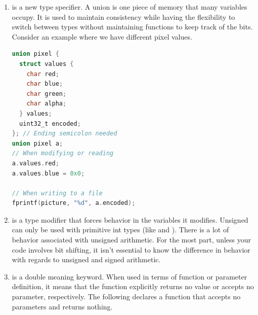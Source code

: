 \begin{enumerate}
	      \begin{lstlisting}[language=C]
typedef float real;
real gravity = 10;
// Also typedef gives us an abstraction over the underlying type used.
// In the future, we only need to change this typedef if we
// wanted our physics library to use doubles instead of floats.

typedef struct link link_t;
//With structs, include the keyword 'struct' as part of the original types
\end{lstlisting}

	      In this class, we regularly typedef functions.
        A typedef for a function can be this for example

	      \begin{lstlisting}[language=C]
typedef int (*comparator)(void*,void*);

int greater_than(void* a, void* b){
    return a > b;
}
comparator gt = greater_than;
\end{lstlisting}

	      This declares a function type comparator that accepts two  params and returns an integer.

	    \item {} is a new type specifier.
        A union is one piece of memory that many variables occupy.
        It is used to maintain consistency while having the flexibility to switch between types without maintaining functions to keep track of the bits.
        Consider an example where we have different pixel values.
	      \begin{lstlisting}[language=C]
union pixel {
  struct values {
    char red;
    char blue;
    char green;
    char alpha;
  } values;
  uint32_t encoded;
}; // Ending semicolon needed
union pixel a;
// When modifying or reading
a.values.red;
a.values.blue = 0x0;

// When writing to a file
fprintf(picture, "%d", a.encoded);
\end{lstlisting}
	    \item {} is a type modifier that forces  behavior in the variables it modifies.
        Unsigned can only be used with primitive int types (like  and ).
        There is a lot of behavior associated with unsigned arithmetic. For the most part, unless your code involves bit shifting, it isn't essential to know the difference in behavior with regards to unsigned and signed arithmetic.

	    \item {} is a double meaning keyword.
        When used in terms of function or parameter definition, it means that the function explicitly returns no value or accepts no parameter, respectively. The following declares a function that accepts no parameters and returns nothing.


\end{enumerate}
